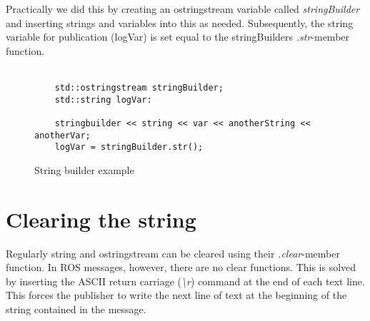 Practically we did this by creating an ostringstream variable called \textit{stringBuilder} and inserting strings and variables into this as needed. Subsequently, the string variable for publication (logVar) is set equal to the stringBuilders \textit{.str}-member function.\\
\\
\begin{figure}[!ht]
\begin{lstlisting}
    std::ostringstream stringBuilder;
    std::string logVar:
    
    stringbuilder << string << var << anotherString << anotherVar;
    logVar = stringBuilder.str();
\end{lstlisting}
\vspace{-10mm}
\caption{String builder example}
\end{figure}

\section{Clearing the string}
Regularly string and ostringstream can be cleared using their \textit{.clear}-member function. In ROS messages, however, there are no clear functions. This is solved by inserting the ASCII return carriage (\textit{\textbackslash r}) command at the end of each text line. This forces the publisher to write the next line of text at the beginning of the string contained in the message.




